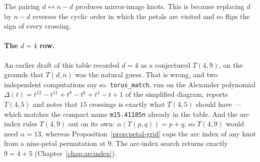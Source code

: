 \documentclass[11pt,oneside]{report}
\theoremstyle{definition}
\begin{document}
The pairing $d \leftrightarrow n - d$ produces mirror-image knots. This is
because replacing $d$ by $n - d$ reverses the cyclic order in which the
petals are visited and so flips the sign of every crossing.

\paragraph{The $d = 4$ row.} An earlier draft of this table recorded
$d = 4$ as a conjectured $T(4,9)$, on the grounds that $T(d,n)$ was the
natural guess. That is wrong, and two independent computations say so.
\texttt{torus\_match}, run on the Alexander polynomial
$\Delta(t) = t^{12} - t^{11} + t^{8} - t^{6} + t^{4} - t + 1$ of the
simplified diagram, reports $T(4,5)$ and notes that $15$ crossings is
exactly what $T(4,5)$ should have --- which matches the compact name
\texttt{m15.41185n} already in the table. And the arc index rules $T(4,9)$
out on its own: $\alpha(T(p,q)) = p + q$, so $T(4,9)$ would need
$\alpha = 13$, whereas Proposition~\ref{prop:petal-grid} caps the arc index
of any knot from a nine-petal permutation at $9$. The arc-index search
returns exactly $9 = 4 + 5$ (Chapter~\ref{chap:arcindex}).
\end{document}
